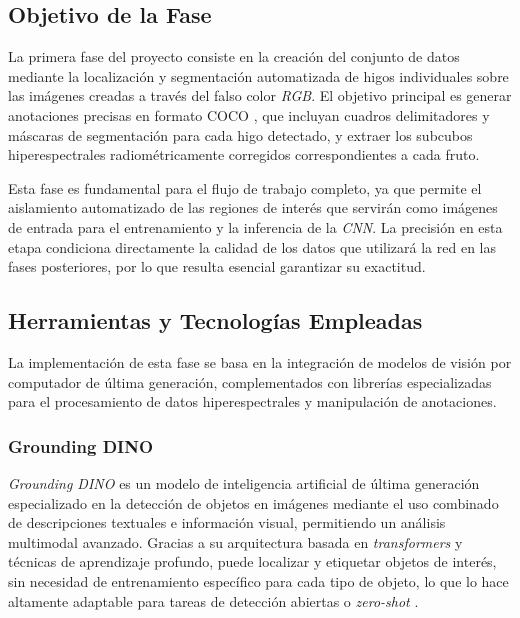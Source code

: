 \subsection{Objetivo de la Fase}
La primera fase del proyecto consiste en la creación del conjunto de datos mediante la localización y segmentación automatizada de higos individuales sobre las imágenes creadas a través del falso color \emph{RGB}. El objetivo principal es generar anotaciones precisas en formato COCO \cite{lin2015microsoftcococommonobjects}, que incluyan cuadros delimitadores y máscaras de segmentación para cada higo detectado, y extraer los subcubos hiperespectrales radiométricamente corregidos correspondientes a cada fruto.

\vspace{5mm}

Esta fase es fundamental para el flujo de trabajo completo, ya que permite el aislamiento automatizado de las regiones de interés que servirán como imágenes de entrada para el entrenamiento y la inferencia de la \emph{CNN}. La precisión en esta etapa condiciona directamente la calidad de los datos que utilizará la red en las fases posteriores, por lo que resulta esencial garantizar su exactitud.

\subsection{Herramientas y Tecnologías Empleadas}

La implementación de esta fase se basa en la integración de modelos de visión por computador de última generación, complementados con librerías especializadas para el procesamiento de datos hiperespectrales y manipulación de anotaciones.

\subsubsection{Grounding DINO}

\emph{Grounding DINO} \cite{liu2023grounding,ren2024grounding} es un modelo de inteligencia artificial de última generación especializado en la detección de objetos en imágenes mediante el uso combinado de descripciones textuales e información visual, permitiendo un análisis multimodal avanzado. Gracias a su arquitectura basada en \emph{transformers} \cite{vaswani2023attentionneed} y técnicas de aprendizaje profundo, puede localizar y etiquetar objetos de interés, sin necesidad de entrenamiento específico para cada tipo de objeto, lo que lo hace altamente adaptable para tareas de detección abiertas o \emph{zero-shot} \cite{socher2013zeroshotlearningcrossmodaltransfer}.

